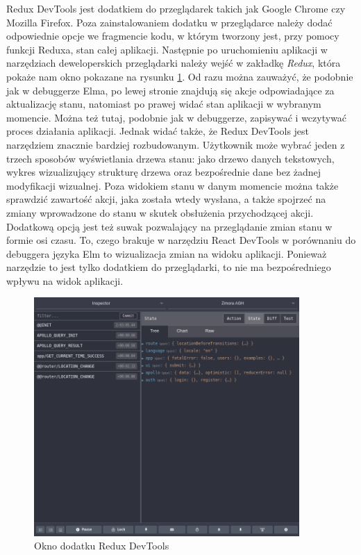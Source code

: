 Redux DevTools jest dodatkiem do przeglądarek takich jak Google Chrome czy Mozilla Firefox. Poza zainstalowaniem dodatku w przeglądarce należy dodać odpowiednie opcje we fragmencie kodu, w którym tworzony jest, przy pomocy funkcji Reduxa, stan całej aplikacji. Następnie po uruchomieniu aplikacji w narzędziach deweloperskich przeglądarki należy wejść w zakładkę \textit{Redux}, która pokaże nam okno pokazane na rysunku \ref{fig:reduxDevTools}. Od razu można zauważyć, że podobnie jak w debuggerze Elma, po lewej stronie znajdują się akcje odpowiadające za aktualizację stanu, natomiast po prawej widać stan aplikacji w wybranym momencie. Można też tutaj, podobnie jak w debuggerze, zapisywać i wczytywać proces działania aplikacji. Jednak widać także, że Redux DevTools jest narzędziem znacznie bardziej rozbudowanym. Użytkownik może wybrać jeden z trzech sposobów wyświetlania drzewa stanu: jako drzewo danych tekstowych, wykres wizualizujący strukturę drzewa oraz bezpośrednie dane bez żadnej modyfikacji wizualnej. Poza widokiem stanu w danym momencie można także sprawdzić zawartość akcji, jaka została wtedy wysłana, a także spojrzeć na zmiany wprowadzone do stanu w skutek obsłużenia przychodzącej akcji. Dodatkową opcją jest też suwak pozwalający na przeglądanie zmian stanu w formie osi czasu. To, czego brakuje w narzędziu React DevTools w porównaniu do debuggera języka Elm to wizualizacja zmian na widoku aplikacji. Ponieważ narzędzie to jest tylko dodatkiem do przeglądarki, to nie ma bezpośredniego wpływu na widok aplikacji.

\begin{figure}[h]
	\centering
	\includegraphics[width=0.9\textwidth]{images/redux_devtools}
	\caption{Okno dodatku Redux DevTools}
	\label{fig:reduxDevTools}
\end{figure}

